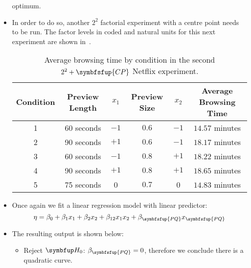 \begin{itemize}
            optimum.
      \item In order to do so, another $2^2$ factorial experiment with a centre point needs to be run. The factor
            levels in coded and natural units for this next experiment are shown in~.
            \begin{table}[!htbp]
                  \centering
                  \caption{Average browsing time by condition in the second $2^2 + \symbfsfup{CP}$ Netflix experiment.}\label{tab:netflixtab3}
                  \begin{tabular}{cccccc}
                        \toprule Condition & Preview Length & $x_{1}$ & Preview Size & $x_{2}$ & Average Browsing Time \\
                        \midrule 1         & 60 seconds     & $-1$    & $0.6$        & $-1$    & $14.57$ minutes       \\
                        2                  & 90 seconds     & $+1$    & $0.6$        & $-1$    & $18.17$ minutes       \\
                        3                  & 60 seconds     & $-1$    & $0.8$        & $+1$    & $18.22$ minutes       \\
                        4                  & 90 seconds     & $+1$    & $0.8$        & $+1$    & $18.65$ minutes       \\
                        5                  & 75 seconds     & 0       & $0.7$        & 0       & $14.83$ minutes       \\
                        \bottomrule
                  \end{tabular}
            \end{table}
      \item Once again we fit a linear regression model with linear predictor:
            \[ \eta=\beta_0+\beta_1x_1+\beta_2x_2+\beta_{12}x_1x_2+\beta_{\symbfsfup{PQ}}x_{\symbfsfup{PQ}} \]
      \item The resulting output is shown below:
            
            \begin{itemize}
                  \item Reject $ \HN $: $ \beta_{\symbfsfup{PQ}}=0 $, therefore we conclude there is a quadratic curve.
            \end{itemize}
\end{itemize}
